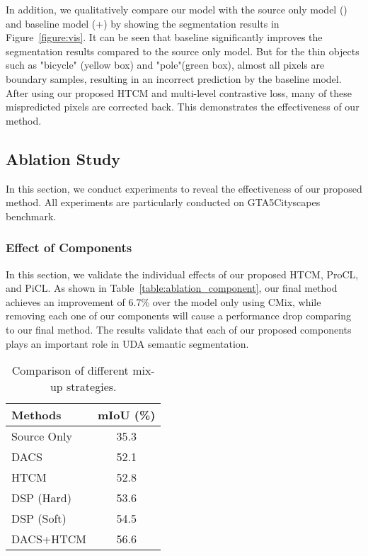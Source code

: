 \documentclass[sigconf]{acmart}
\begin{document}
	In addition,  we qualitatively compare our model with the source only model () and baseline model (+) by showing the segmentation results in Figure~\ref{figure:vis}. It can be seen that baseline significantly improves the segmentation results compared to the source only model. But for the thin objects such as "bicycle" (yellow box) and "pole"(green box), almost all pixels are boundary samples, resulting in an incorrect prediction by the baseline model. After using our proposed HTCM and multi-level contrastive loss, many of these mispredicted pixels are corrected back. This demonstrates the effectiveness of our method. 
	
	\subsection{Ablation Study}
	In this section, we conduct experiments to reveal the effectiveness of our proposed method. All experiments are particularly conducted on GTA5Cityscapes benchmark.
	
	
	
	\subsubsection{Effect of Components}
	In this section, we validate the individual effects of our proposed HTCM, ProCL, and PiCL. As shown in Table~\ref{table:ablation_component}, our final method achieves an improvement of 6.7\% over the model only using CMix, while removing each one of our components will cause a performance drop comparing to our final method. The results validate that each of our proposed components plays an important role in UDA semantic segmentation.
	
	\begin{table}[htb]
		\caption{Comparison of different mix-up strategies.}
		\centering
		\renewcommand{\arraystretch}{1.2}
		\setlength{\tabcolsep}{8pt}
		\begin{tabular}{l|c}
			
			\toprule
			Methods  				& mIoU (\%)			\\
			\hline
			\hline
			Source Only	& 35.3\\
			DACS					& 52.1				\\
			HTCM					& 52.8	\\
			\hline
			DSP (Hard)		& 53.6 	\\
			DSP (Soft)		& 54.5 	\\	
			DACS+HTCM			& 56.6	 	\\
			\bottomrule	
		\end{tabular}
		\vspace{2mm}
		\label{table:data augmentation}
	\end{table}
	
\end{document}
